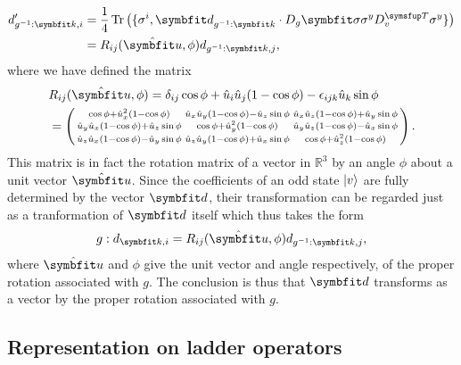 \begin{equation}
    \label{eq:Group:pdRep:transformedD}
    \begin{split}
        d'_{g^{-1}:\v{k},i} &= \frac{1}{4}\tr\big(\{\sigma^i, \v{d}_{g^{-1}:\v{k}}\cdot D_g\v{\sigma}\sigma^yD_v^\trans\sigma^y\}\big)\\
        &= R_{ij}(\hat{\v{u}},\phi)d_{g^{-1}:\v{k},j},
    \end{split}
\end{equation}
where we have defined the matrix
\begin{equation}
    \label{eq:Group:pdRep:rotMatrixIndices}
    \begin{split}
        &R_{ij}(\hat{\v{u}},\phi) = \delta_{ij}\cos\phi + \hat{u}_i\hat{u}_j(1-\cos\phi)-\epsilon_{ijk}\hat{u}_k\sin\phi\\
        & = 
        \left(\begin{smallmatrix}
            \cos\phi + \hat{u}_x^2(1-\cos\phi) & \hat{u}_x\hat{u}_y(1-\cos\phi)-\hat{u}_z\sin\phi & \hat{u}_x\hat{u}_z(1-\cos\phi)+\hat{u}_y\sin\phi\\
            \hat{u}_y\hat{u}_x(1-\cos\phi)+\hat{u}_z\sin\phi & \cos\phi+\hat{u}_y^2(1-\cos\phi) & \hat{u}_y\hat{u}_z(1-\cos\phi)-\hat{u}_x\sin\phi\\
            \hat{u}_z\hat{u}_x(1-\cos\phi)-\hat{u}_y\sin\phi & \hat{u}_z\hat{u}_y(1-\cos\phi)+\hat{u}_x\sin\phi & \cos\phi+\hat{u}_z^2(1-\cos\phi)
        \end{smallmatrix}\right).
    \end{split}
\end{equation}
This matrix is in fact the rotation matrix of a vector in $\mathbb{R}^3$ by an angle $\phi$ about a unit vector $\hat{\v{u}}$. Since the coefficients
 of an odd state $\lvert v \rangle$ are fully determined by the vector $\v{d}$, their transformation can be regarded just as a tranformation of $\v{d}$ itself
 which thus takes the form
\begin{equation}
    \label{eq:Group:pdRep:dTranformation}
    g:d_{\v{k},i} = R_{ij}(\hat{\v{u}},\phi)d_{g^{-1}:\v{k},j},
\end{equation}
where $\hat{\v{u}}$ and $\phi$ give the unit vector and angle respectively, of the proper rotation associated with $g$. The conclusion is thus that
$\v{d}$ transforms as a vector by the proper rotation associated with $g$.


\subsection{Representation on ladder operators}
\label{sec:Group:App:Ladder}

